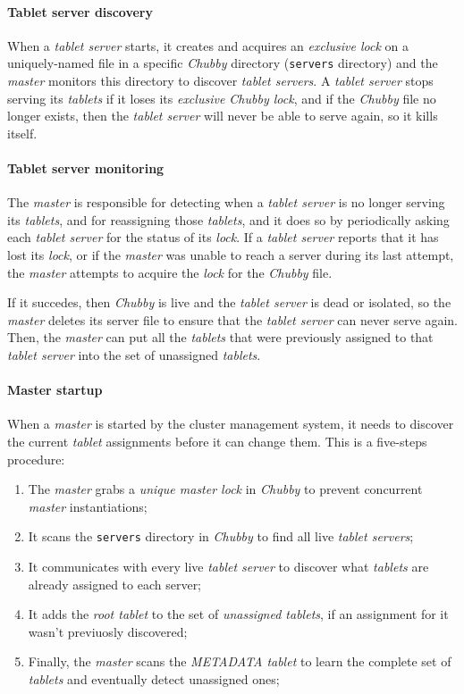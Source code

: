 \paragraph{Tablet server discovery}
When a \emph{tablet server} starts, it creates and acquires an
\emph{exclusive lock} on a uniquely-named file in a specific \emph{Chubby}
directory (\texttt{servers} directory) and the \emph{master} monitors this directory
to discover \emph{tablet servers}. A \emph{tablet server} stops serving its
\emph{tablets} if it loses its \emph{exclusive Chubby lock}, and if the
\emph{Chubby} file no longer exists, then the \emph{tablet server} will never
be able to serve again, so it kills itself.

\paragraph{Tablet server monitoring}
The \emph{master} is responsible for detecting when a \emph{tablet server} is no
longer serving its \emph{tablets}, and for reassigning those \emph{tablets},
and it does so by periodically asking each \emph{tablet server} for the status of
its \emph{lock}. If a \emph{tablet server} reports that it has lost its
\emph{lock}, or if the \emph{master} was unable to reach a server during its last
attempt, the \emph{master} attempts to acquire the \emph{lock} for the
\emph{Chubby} file.

If it succedes, then \emph{Chubby} is live and the \emph{tablet server} is dead
or isolated, so the \emph{master} deletes its server file to ensure that the
\emph{tablet server} can never serve again. Then, the \emph{master} can put
all the \emph{tablets} that were previously assigned to that \emph{tablet
server} into the set of unassigned \emph{tablets}.

\paragraph{Master startup}
When a \emph{master} is started by the cluster management system, it needs to
discover the current \emph{tablet} assignments before it can change them. This
is a five-steps procedure:
\begin{enumerate}
    \item The \emph{master} grabs a \emph{unique master lock} in \emph{Chubby}
    to prevent concurrent \emph{master} instantiations;
    \item It scans the \texttt{servers} directory in \emph{Chubby} to find all
    live
    \emph{tablet servers};
    \item It communicates with every live \emph{tablet server} to discover what
    \emph{tablets} are already assigned to each server;
    \item It adds the \emph{root tablet} to the set of \emph{unassigned tablets},
    if an assignment for it wasn't previuosly discovered;
    \item Finally, the \emph{master} scans the \emph{METADATA tablet} to learn
    the complete set of \emph{tablets} and eventually detect unassigned ones;
\end{enumerate}

